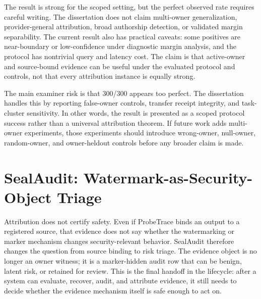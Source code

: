 The result is strong for the scoped setting, but the perfect observed rate requires careful writing. The dissertation does not claim multi-owner generalization, provider-general attribution, broad authorship detection, or validated margin separability. The current result also has practical caveats: some positives are near-boundary or low-confidence under diagnostic margin analysis, and the protocol has nontrivial query and latency cost. The claim is that active-owner and source-bound evidence can be useful under the evaluated protocol and controls, not that every attribution instance is equally strong.

The main examiner risk is that 300/300 appears too perfect. The dissertation handles this by reporting false-owner controls, transfer receipt integrity, and task-cluster sensitivity. In other words, the result is presented as a scoped protocol success rather than a universal attribution theorem. If future work adds multi-owner experiments, those experiments should introduce wrong-owner, null-owner, random-owner, and owner-heldout controls before any broader claim is made.

\section{SealAudit: Watermark-as-Security-Object Triage}

Attribution does not certify safety. Even if ProbeTrace binds an output to a registered source, that evidence does not say whether the watermarking or marker mechanism changes security-relevant behavior. SealAudit therefore changes the question from source binding to risk triage. The evidence object is no longer an owner witness; it is a marker-hidden audit row that can be benign, latent risk, or retained for review. This is the final handoff in the lifecycle: after a system can evaluate, recover, audit, and attribute evidence, it still needs to decide whether the evidence mechanism itself is safe enough to act on.

